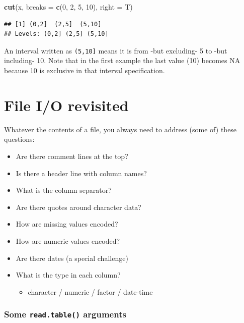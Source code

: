 \documentclass[]{book}
\newenvironment{Shaded}{\begin{snugshade}}{\end{snugshade}}
\newcommand{\DataTypeTok}[1]{\textcolor[rgb]{0.13,0.29,0.53}{#1}}
\newcommand{\DecValTok}[1]{\textcolor[rgb]{0.00,0.00,0.81}{#1}}
\newcommand{\KeywordTok}[1]{\textcolor[rgb]{0.13,0.29,0.53}{\textbf{#1}}}
\newcommand{\NormalTok}[1]{#1}
\providecommand{\tightlist}{%
  \setlength{\itemsep}{0pt}\setlength{\parskip}{0pt}}
\begin{document}
\begin{Shaded}
\begin{Highlighting}[]
\KeywordTok{cut}\NormalTok{(x, }\DataTypeTok{breaks =} \KeywordTok{c}\NormalTok{(}\DecValTok{0}\NormalTok{, }\DecValTok{2}\NormalTok{, }\DecValTok{5}\NormalTok{, }\DecValTok{10}\NormalTok{), }\DataTypeTok{right =}\NormalTok{ T)}
\end{Highlighting}
\end{Shaded}

\begin{verbatim}
## [1] (0,2]  (2,5]  (5,10]
## Levels: (0,2] (2,5] (5,10]
\end{verbatim}

An interval written as \texttt{(5,10{]}} means it is from -but excluding- 5 to -but including- 10.
Note that in the first example the last value (10) becomes NA because 10 is exclusive in that interval specification.

\hypertarget{file-io-revisited}{%
\section{File I/O revisited}\label{file-io-revisited}}

Whatever the contents of a file, you always need to address (some of) these questions:

\begin{itemize}
\tightlist
\item
  Are there comment lines at the top?
\item
  Is there a header line with column names?
\item
  What is the column separator?
\item
  Are there quotes around character data?
\item
  How are missing values encoded?
\item
  How are numeric values encoded?
\item
  Are there dates (a special challenge)
\item
  What is the type in each column?

  \begin{itemize}
  \tightlist
  \item
    character / numeric / factor / date-time
  \end{itemize}
\end{itemize}

\hypertarget{some-read.table-arguments}{%
\subsubsection*{\texorpdfstring{Some \texttt{read.table()} arguments}{Some read.table() arguments}}\label{some-read.table-arguments}}
\end{document}
